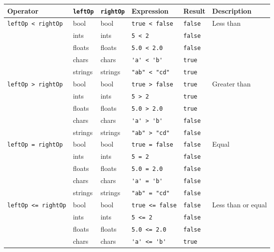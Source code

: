 \begin{table}[ht]
  \centering
  \begin{tabularx}{\linewidth}{|l|l|l|l|l|X|}
    \hline
    \rowcolor{headerRowColor} Operator & \lstinline!leftOp! & \lstinline!rightOp! & Expression & Result &Description\\
    \hline
    \lstinline!leftOp < rightOp!&bool & bool & \lstinline!true < false!&\lstinline!false!&Less than\\
             &ints & ints & \lstinline!5 < 2!&\lstinline!false!&\\
             &floats & floats & \lstinline!5.0 < 2.0!&\lstinline!false!&\\
             &chars & chars & \lstinline!'a' < 'b'!&\lstinline!true!&\\
             &strings & strings & \lstinline!"ab" < "cd"!&\lstinline!true!&\\
    \hline
    \lstinline!leftOp > rightOp!&bool & bool & \lstinline!true > false!&\lstinline!true!&Greater than\\
             &ints & ints & \lstinline!5 > 2!&\lstinline!true!&\\
             &floats & floats & \lstinline!5.0 > 2.0!&\lstinline!true!&\\
             &chars & chars & \lstinline!'a' > 'b'!&\lstinline!false!&\\
             &strings & strings & \lstinline!"ab" > "cd"!&\lstinline!false!&\\
    \hline
    \lstinline!leftOp = rightOp!&bool & bool & \lstinline!true = false!&\lstinline!false!&Equal\\
             &ints & ints & \lstinline!5 = 2!&\lstinline!false!&\\
             &floats & floats & \lstinline!5.0 = 2.0!&\lstinline!false!&\\
             &chars & chars & \lstinline!'a' = 'b'!&\lstinline!false!&\\
             &strings & strings & \lstinline!"ab" = "cd"!&\lstinline!false!&\\
    \hline
    \lstinline!leftOp <= rightOp!&bool & bool & \lstinline!true <= false!&\lstinline!false!&Less than or equal\\
             &ints & ints & \lstinline!5 <= 2!&\lstinline!false!&\\
             &floats & floats & \lstinline!5.0 <= 2.0!&\lstinline!false!&\\
             &chars & chars & \lstinline!'a' <= 'b'!&\lstinline!true!&\\

\end{tabularx}
\end{table}
